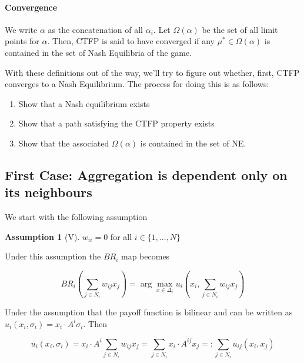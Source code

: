 \documentclass{article}
\theoremstyle{definition}
\newtheorem*{assumption}{Assumption}
\begin{document}
	\paragraph{Convergence} We write $\alpha$ as the concatenation of all $\alpha_i$. Let $\Omega(\alpha)$ be  the set of all limit points for $\alpha$. Then, CTFP is said to have converged if any $\mu^* \in \Omega(\alpha)$ is contained in the set of Nash Equilibria of the game.
	
	With these definitions out of the way, we'll try to figure out whether, first, CTFP converges to a Nash Equilibrium. The process for doing this is as follows:
	
	\begin{enumerate}
		\item Show that a Nash equilibrium exists
		\item Show that a path satisfying the CTFP property exists
		\item Show that the associated $\Omega(\alpha)$ is contained in the set of NE.

	\end{enumerate}

	\newpage
	
	\subsection*{First Case: Aggregation is dependent only on its neighbours}
	
	We start with the following assumption
	
	\begin{assumption}[V]
	$w_{ii} = 0$ for all $i \in \{ 1, ..., N \}$
	\end{assumption}
	
	Under this assumption the $BR_i$ map becomes
	
	\begin{equation}
		BR_i(\sum_{j \in N_i} w_{ij} x_j) = \arg\max_{x \in \Delta_i} u_i(x_i,\sum_{j \in N_i} w_{ij} x_j)
	\end{equation}
	
	Under the assumption that the payoff function is bilinear and can be written as $u_i(x_i, \sigma_i) = x_i \cdot A^i \sigma_i$. Then 
	
	\begin{equation*}
		u_i(x_i, \sigma_i) = x_i \cdot A^i \sum_{j \in N_i} w_{ij} x_j = \sum_{j \in N_i} x_i \cdot A^{ij} x_j =: \sum_{j \in N_i} u_{ij}(x_i, x_j) 
	\end{equation*}
	
\end{document}
